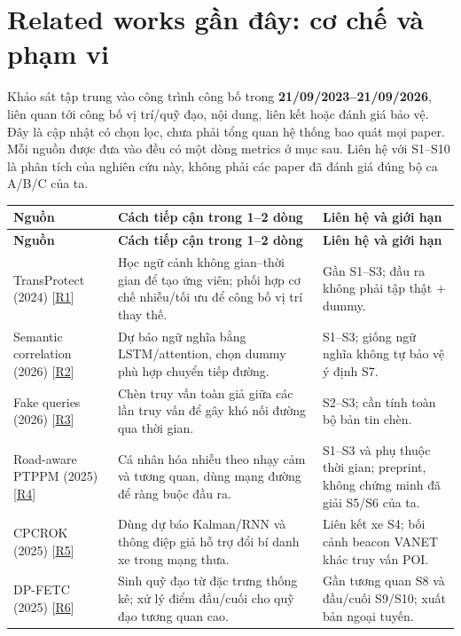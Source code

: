\documentclass[10pt,a4paper]{article}
\begin{document}
\clearpage
\section{Related works gần đây: cơ chế và phạm vi}
Khảo sát tập trung vào công trình công bố trong \textbf{21/09/2023–21/09/2026}, liên quan tới công bố vị trí/quỹ đạo, nội dung, liên kết hoặc đánh giá bảo vệ. Đây là cập nhật có chọn lọc, chưa phải tổng quan hệ thống bao quát mọi paper. Mỗi nguồn được đưa vào đều có một dòng metrics ở mục sau. Liên hệ với S1–S10 là phân tích của nghiên cứu này, không phải các paper đã đánh giá đúng bộ ca A/B/C của ta.

\begingroup\small
\begin{longtable}{@{}P{3.839cm}P{6.301cm}P{6.498cm}@{}}
\toprule
\textbf{Nguồn} & \textbf{Cách tiếp cận trong 1–2 dòng} & \textbf{Liên hệ và giới hạn}\\\midrule
\endfirsthead
\toprule
\textbf{Nguồn} & \textbf{Cách tiếp cận trong 1–2 dòng} & \textbf{Liên hệ và giới hạn}\\\midrule
\endhead
\bottomrule\endfoot
TransProtect (2024) [\hyperlink{ref-R1}{R1}] & Học ngữ cảnh không gian–thời gian để tạo ứng viên; phối hợp cơ chế nhiễu/tối ưu để công bố vị trí thay thế. & Gần S1–S3; đầu ra không phải tập thật + dummy.\\
\addlinespace[3pt]
Semantic correlation (2026) [\hyperlink{ref-R2}{R2}] & Dự báo ngữ nghĩa bằng LSTM/attention, chọn dummy phù hợp chuyển tiếp đường. & S1–S3; giống ngữ nghĩa không tự bảo vệ ý định S7.\\
\addlinespace[3pt]
Fake queries (2026) [\hyperlink{ref-R3}{R3}] & Chèn truy vấn toàn giả giữa các lần truy vấn để gây khó nối đường qua thời gian. & S2–S3; cần tính toàn bộ bản tin chèn.\\
\addlinespace[3pt]
Road-aware PTPPM (2025) [\hyperlink{ref-R4}{R4}] & Cá nhân hóa nhiễu theo nhạy cảm và tương quan, dùng mạng đường để ràng buộc đầu ra. & S1–S3 và phụ thuộc thời gian; preprint, không chứng minh đã giải S5/S6 của ta.\\
\addlinespace[3pt]
CPCROK (2025) [\hyperlink{ref-R5}{R5}] & Dùng dự báo Kalman/RNN và thông điệp giả hỗ trợ đổi bí danh xe trong mạng thưa. & Liên kết xe S4; bối cảnh beacon VANET khác truy vấn POI.\\
\addlinespace[3pt]
DP-FETC (2025) [\hyperlink{ref-R6}{R6}] & Sinh quỹ đạo từ đặc trưng thống kê; xử lý điểm đầu/cuối cho quỹ đạo tương quan cao. & Gần tương quan S8 và đầu/cuối S9/S10; xuất bản ngoại tuyến.\\

\end{longtable}
\end{document}
